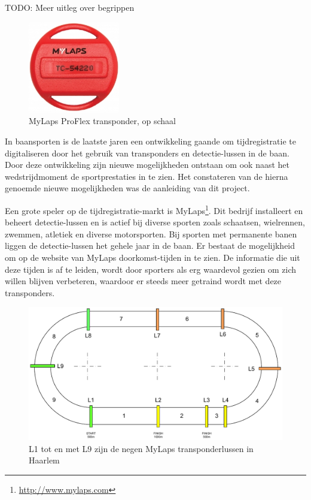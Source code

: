 \newcommand{\aanleiding}{}

{\par \bigskip \par \color{red} TODO: Meer uitleg over begrippen \par \bigskip \par }

\begin{figure}
  \begin{center}
    \includegraphics[width=4cm]{style/images/transponder}
  \end{center}
  \caption{MyLaps ProFlex transponder, op schaal} 
\end{figure}

In baansporten is de laatste jaren een ontwikkeling gaande om tijdregistratie te digitaliseren door het gebruik van transponders en detectie-lussen in de baan. Door deze ontwikkeling zijn nieuwe mogelijkheden ontstaan om ook naast het wedstrijdmoment de sportprestaties in te zien. Het constateren van de hierna genoemde nieuwe mogelijkheden was de aanleiding van dit project.

Een grote speler op de tijdregistratie-markt is MyLaps\footnote{\url{http://www.mylaps.com}}. Dit bedrijf installeert en beheert detectie-lussen en is actief bij diverse sporten zoals schaatsen, wielrennen, zwemmen, atletiek en diverse motorsporten. Bij sporten met permanente banen liggen de detectie-lussen het gehele jaar in de baan. Er bestaat de mogelijkheid om op de website van MyLaps doorkomst-tijden in te zien. De informatie die uit deze tijden is af te leiden, wordt door sporters als erg waardevol gezien om zich willen blijven verbeteren, waardoor er steeds meer getraind wordt met deze transponders.

\begin{figure}
  \label{fig:track-transponders}
  \begin{center}
    \includegraphics[width=\textwidth]{style/images/BaanoverzichtHaarlem}
  \end{center}
  \caption{L1 tot en met L9 zijn de negen MyLaps transponderlussen in Haarlem}
\end{figure}

